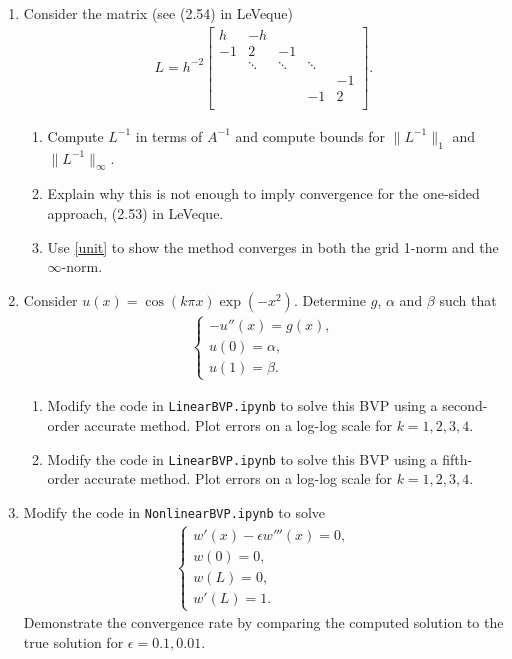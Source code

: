 \documentclass[10pt]{amsart}
\begin{document}
\begin{enumerate}[label={\bf Problem~{\arabic*}:}]
  \item Consider the matrix (see (2.54) in LeVeque)
    \begin{align*}
      L = h^{-2} \begin{bmatrix} h & -h \\ -1 & 2 &-1 \\  
    & \ddots & \ddots & \ddots \\
    &&&& -1\\
    &&&-1& 2\\
  \end{bmatrix}.\end{align*}
\begin{enumerate}
  \item Compute $L^{-1}$ in terms of $A^{-1}$ and compute bounds for  $\|L^{-1}\|_1$ and $\|L^{-1}\|_\infty$.
  \item Explain why this is not enough to imply convergence for the one-sided approach, (2.53) in LeVeque.
    \item Use \eqref{unit} to show the method converges in both the grid 1-norm and the $\infty$-norm.
  \end{enumerate}
\mline

\item Consider $u(x) = \cos(k \pi x) \exp(-x^2)$.  Determine $g$, $\alpha$ and $\beta$ such that
  \begin{align*}
    \begin{cases} -u''(x) = g(x),\\
      u(0) = \alpha,\\
      u(1) = \beta. \end{cases}
  \end{align*}
  \begin{enumerate}
  \item Modify the code in {\tt LinearBVP.ipynb} to solve this BVP using a second-order accurate method.  Plot errors on a log-log scale for $k = 1,2,3,4$.
   \item Modify the code in {\tt LinearBVP.ipynb} to solve this BVP using a fifth-order accurate method.  Plot errors on a log-log scale for $k = 1,2,3,4$. 
  \end{enumerate}
  \mline

\item Modify the code in {\tt NonlinearBVP.ipynb} to solve
  \begin{align*}
 \begin{cases}
 w'(x) - \epsilon w'''(x) = 0,\\
 w(0) = 0,\\
 w(L) = 0,\\
 w'(L) = 1.
 \end{cases}
  \end{align*}
 Demonstrate the convergence rate by comparing the computed solution
 to the true solution for $\epsilon = 0.1, 0.01$.
  
  \end{enumerate}
\end{document}

